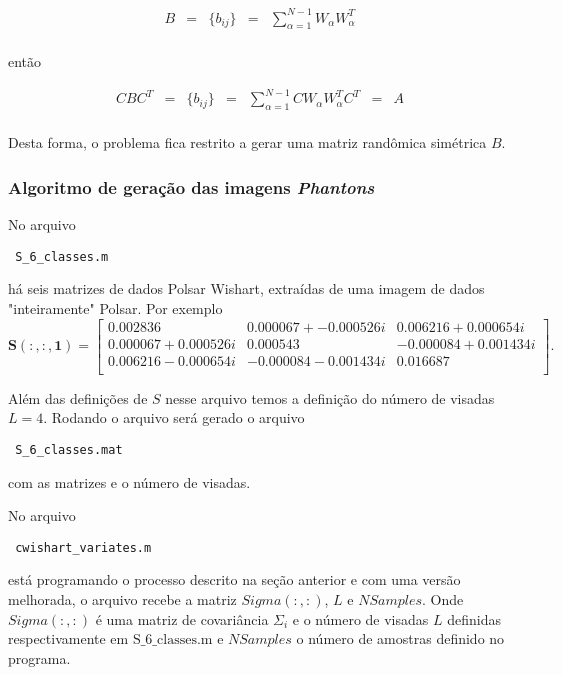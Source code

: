 \begin{equation}\label{eqn118}
\begin{array}{ccccc}
	B&=&\{b_{ij}\}&=&\sum_{\alpha=1}^{N-1}W_{\alpha}W_{\alpha}^{T} \\
\end{array}
\end{equation}

então

\begin{equation}\label{eqn119}
\begin{array}{ccccccc}
	CBC^{T}&=&\{b_{ij}\}&=&\sum_{\alpha=1}^{N-1}CW_{\alpha}W_{\alpha}^{T}C^{T}&=&A \\
\end{array}
\end{equation}

Desta forma, o problema fica restrito a gerar uma matriz randômica simétrica $B$.

\subsubsection{Algoritmo de geração das imagens {\it Phantons}} 

No arquivo \begin{verbatim} S_6_classes.m \end{verbatim} há seis matrizes de dados Polsar Wishart, extraídas de uma imagem de dados "inteiramente" Polsar. Por exemplo  
$$
\mathbf{S(:, :, 1)} = \left[
\begin{array}{lll}
	0.002836  &0.000067+-0.000526i &0.006216+0.000654i\\
	0.000067+0.000526i &0.000543 & -0.000084+0.001434i\\
	0.006216-0.000654i& -0.000084-0.001434i & 0.016687\\
\end{array}
\right].
$$

Além das definições de $S$ nesse arquivo temos a definição do número de visadas $L=4$. Rodando o arquivo será gerado o arquivo \begin{verbatim} S_6_classes.mat \end{verbatim} com as matrizes e o número de visadas.

No arquivo \begin{verbatim} cwishart_variates.m \end{verbatim} está programando o processo descrito na seção anterior e com uma versão melhorada, o arquivo recebe a matriz  $Sigma(:,:)$, $L$ e  $NSamples$. Onde $Sigma(:,:)$ é uma matriz de covariância $\Sigma_i$ e o número de visadas $L$ definidas respectivamente em $\mbox{S\_6\_classes.m}$ e $NSamples$ o número de amostras definido no programa.

